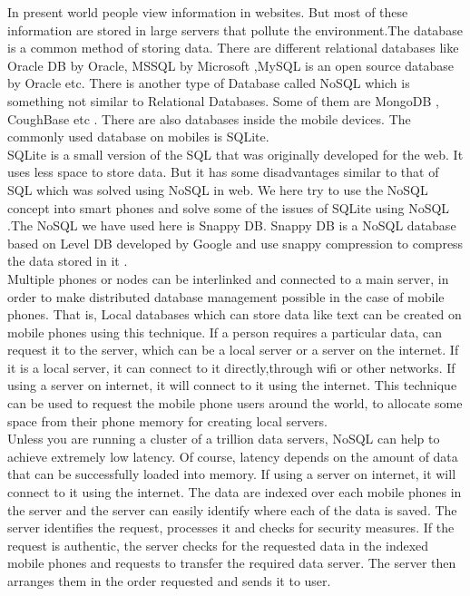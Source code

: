 \documentclass[12pt, a4paper]{article}
\begin{document}
\hspace{5mm}In present world people view information in websites. But most of these information are stored in large servers that pollute the environment.The database is a common method of storing data. There are different relational databases like Oracle DB by Oracle, MSSQL by Microsoft ,MySQL is an open source database by Oracle etc. There is another type of Database called NoSQL which is something not similar to Relational Databases. Some of them are MongoDB , CoughBase etc . There are also databases inside the mobile devices. The commonly used database on mobiles is SQLite.
\\

\hspace{5mm} SQLite is a small version of the SQL that was originally developed for the web. It uses less space to store data. But it has some disadvantages similar to that of SQL which was solved using NoSQL in web. We here try to use the NoSQL concept into smart phones and solve some of the issues of SQLite using NoSQL .The NoSQL we have used here is Snappy DB. Snappy DB is a NoSQL database based on Level DB developed by Google and use snappy compression to compress the data stored in it .
\\

\hspace{5mm}Multiple phones or nodes can be interlinked and connected to a main server, in order to make distributed database management possible in the case of mobile phones. That is, Local databases which can store data like text can be created on mobile phones using this technique. If a person requires a particular data,  can request it to the server, which can be a local server or a server on the internet. If it is a local server, it can connect to it directly,through wifi or other networks. If using a server on internet, it will connect to it using the internet. This technique can be used to request the mobile phone users around the world, to allocate some space from their phone memory for creating local servers.
\\

\hspace{5mm} Unless you are running a cluster of a trillion data servers, NoSQL can help to achieve extremely low latency. Of course, latency depends on the amount of data that can be successfully loaded into memory. If using a server on internet, it will connect to it using the internet. The data are indexed over each mobile phones in the server and the server can easily identify where each of the data is saved. The server identiﬁes the request, processes it and checks for security measures. If the request is authentic, the server checks for the requested data in the indexed mobile phones and requests to transfer the required data server. The server then arranges them in the order requested and sends it to user. 
 \\
 
\end{document}
